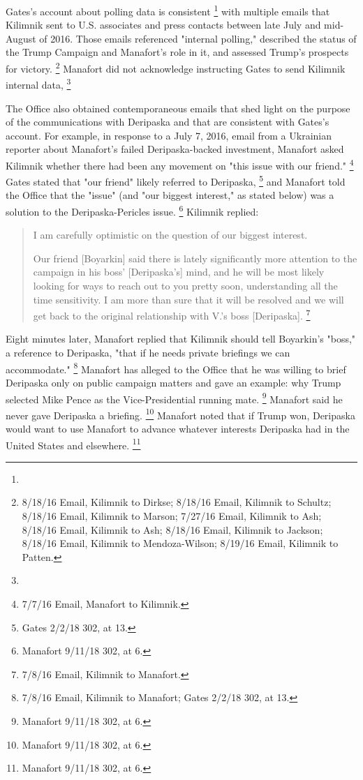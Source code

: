 Gates's account about polling data is consistent
\footnote{}
with multiple emails that Kilimnik sent to U.S. associates and press contacts between late July and mid-August of 2016.
Those emails referenced "internal polling," described the status of the Trump Campaign and Manafort's role in it, and assessed Trump's prospects for victory.%
\footnote{8/18/16 Email, Kilimnik to Dirkse;
8/18/16 Email, Kilimnik to Schultz;
8/18/16 Email, Kilimnik to Marson;
7/27/16 Email, Kilimnik to Ash;
8/18/16 Email, Kilimnik to Ash;
8/18/16 Email, Kilimnik to Jackson;
8/18/16 Email, Kilimnik to Mendoza-Wilson;
8/19/16 Email, Kilimnik to Patten.}
Manafort did not acknowledge instructing Gates to send Kilimnik internal data,
\footnote{}

The Office also obtained contemporaneous emails that shed light on the purpose of the communications with Deripaska and that are consistent with Gates's account.
For example, in response to a July 7, 2016, email from a Ukrainian reporter about Manafort's failed Deripaska-backed investment, Manafort asked Kilimnik whether there had been any movement on "this issue with our friend."%
\footnote{7/7/16 Email, Manafort to Kilimnik.}
Gates stated that "our friend" likely referred to Deripaska,%
\footnote{Gates 2/2/18 302, at 13.}
and Manafort told the Office that the "issue" (and "our biggest interest," as stated below) was a solution to the Deripaska-Pericles issue.%
\footnote{Manafort 9/11/18 302, at 6.}
Kilimnik replied:

\begin{quote}
I am carefully optimistic on the question of our biggest interest.

Our friend [Boyarkin] said there is lately significantly more attention to the campaign in his boss' [Deripaska's] mind, and he will be most likely looking for ways to reach out to you pretty soon, understanding all the time sensitivity.
I am more than sure that it will be resolved and we will get back to the original relationship with V.'s boss [Deripaska].%
\footnote{7/8/16 Email, Kilimnik to Manafort.}
\end{quote}

Eight minutes later, Manafort replied that Kilimnik should tell Boyarkin's "boss," a reference to Deripaska, "that if he needs private briefings we can accommodate."%
\footnote{7/8/16 Email, Kilimnik to Manafort;
Gates 2/2/18 302, at 13.}
Manafort has alleged to the Office that he was willing to brief Deripaska only on public campaign matters and gave an example: why Trump selected Mike Pence as the Vice-Presidential running mate.%
\footnote{Manafort 9/11/18 302, at 6.}
Manafort said he never gave Deripaska a briefing.%
\footnote{Manafort 9/11/18 302, at 6.}
Manafort noted that if Trump won, Deripaska would want to use Manafort to advance whatever interests Deripaska had in the United States and elsewhere.%
\footnote{Manafort 9/11/18 302, at 6.}

